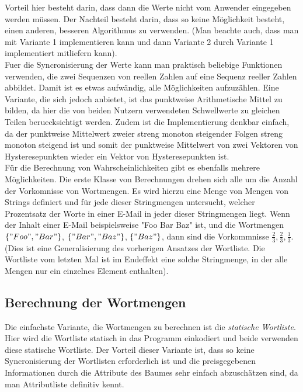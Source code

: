 \documentclass{article}
\theoremstyle{definition}
\theoremstyle{remark}
\begin{document}
Vorteil hier besteht darin, dass dann die Werte nicht vom Anwender eingegeben
werden m\"ussen. Der Nachteil besteht darin, dass so keine M\"oglichkeit besteht,
einen anderen, besseren Algorithmus zu verwenden. (Man beachte auch, dass man
mit Variante 1 implementieren kann und dann Variante 2 durch Variante 1
implementiert mitliefern kann).\\
Fuer die Syncronisierung der Werte kann man praktisch beliebige Funktionen
verwenden, die zwei Sequenzen von reellen Zahlen auf eine Sequenz reeller
Zahlen abbildet. Damit ist es etwas aufw\"andig, alle M\"oglichkeiten
aufzuz\"ahlen. Eine Variante, die sich jedoch anbietet, ist das punktweise
Arithmetische Mittel zu bilden, da hier die von beiden Nutzern verwendeten
Schwellwerte zu gleichen Teilen beruecksichtigt werden. Zudem ist die
Implementierung denkbar einfach, da der punktweise Mittelwert zweier 
streng monoton steigender Folgen streng monoton steigend ist und somit 
der punktweise Mittelwert von zwei Vektoren von Hysteresepunkten wieder
ein Vektor von Hysteresepunkten ist. \\
F\"ur die Berechnung von Wahrscheinlichkeiten gibt es ebenfalls mehrere
M\"oglichkeiten. Die erste Klasse von Berechnungen drehen sich alle um 
die Anzahl der Vorkomnisse von Wortmengen. Es wird hierzu eine Menge von Mengen
von Strings definiert und f\"ur jede dieser Stringmengen untersucht, welcher
Prozentsatz der Worte in einer E-Mail in jeder dieser Stringmengen liegt.
Wenn der Inhalt einer E-Mail beispielsweise "Foo Bar Baz" ist, und die
Wortmengen \(\{"Foo", "Bar"\}\), \(\{"Bar", "Baz"\}\), \(\{"Baz"\}\), dann sind
die Vorkommnisse \(\frac{2}{3}, \frac{2}{3}, \frac{1}{3}\). (Dies ist eine
Generalisierung des vorherigen Ansatzes der Wortliste. Die Wortliste vom
letzten Mal ist im Endeffekt eine solche Stringmenge, in der alle Mengen
nur ein einzelnes Element enthalten).
\(<TODO|Bewertung>\)\\
\(<TODO|Phasendiagramm>\)

\subsection{Berechnung der Wortmengen}
Die einfachste Variante, die Wortmengen zu berechnen ist die {\em statische
Wortliste}. Hier wird die Wortliste statisch in das Programm einkodiert
und beide verwenden diese statische Wortliste. Der Vorteil dieser
Variante ist, dass so keine Syncronisierung der Wortlisten erforderlich ist
und die preisgegebenen Informationen durch die Attribute des Baumes
sehr einfach abzusch\"atzen sind, da man Attributliste definitiv kennt.
\end{document}
